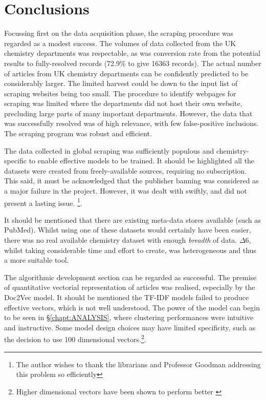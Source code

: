 \chapter{Conclusions}
Focussing first on the data acquisition phase, the scraping procedure was regarded as a modest success. The volumes of data collected from the UK chemistry departments was respectable, as was conversion rate from the potential results to fully-resolved records (72.9\%  to give 16363 records). The actual number of articles from UK chemistry departments can be confidently predicted to be considerably larger. The limited harvest could be down to the input list of scraping websites being too small. The procedure to identify webpages for scraping was limited where the departments did not host their own website, precluding large parts of many important departments.  However, the data that was successfully resolved was of high relevance, with few false-positive inclusions. The scraping program was robust and efficient.

The data collected in global scraping was sufficiently populous and chemistry-specific  to enable effective models to be trained. It should be highlighted all the datasets were created from freely-available sources, requiring no subscription. This said, it must be acknowledged that the publisher banning was considered as a major failure in the project. However, it was dealt with swiftly, and did not present a lasting issue. \footnote{The author wishes to thank the librarians and Professor Goodman addressing this problem so efficiently }.

 It should be mentioned that there are existing meta-data stores available (such as PubMed). Whilst using one of these datasets would certainly have been easier, there was no real available chemistry dataset with enough \emph{breadth} of data. $\Delta6$, whilst taking considerable time and effort to create, was heterogeneous and thus a more suitable tool.

The algorithmic development section can be regarded as successful. The premise of quantitative vectorial representation of articles was realised, especially by the Doc2Vec model. It should be mentioned the TF-IDF models failed to produce effective vectors, which is not well understood. The power of the model can begin to be seen in \S\ref{chapt:ANALYSIS}, where clustering performances were intuitive and instructive.
Some model design choices may have limited specificity, such as the decision to use 100 dimensional vectors.\footnote{Higher dimensional vectors have been shown to perform better \cite{word2vec1}}.


